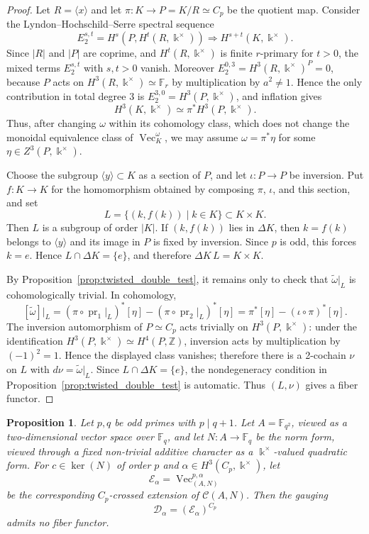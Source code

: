 \documentclass[12pt]{amsart}
\theoremstyle{plain}
\newtheorem{proposition}[theorem]{Proposition}
\theoremstyle{definition} %
\theoremstyle{remark} %
\newcommand{\ku}{{\Bbbk}} %
\DeclareMathOperator{\VecCat}{Vec}
\newcommand{\Vect}[1]{\VecCat_{#1}}
\newcommand{\cC}{\mathcal{C}}
\newcommand{\cD}{\mathcal{D}}
\newcommand{\cE}{\mathcal{E}}
\newcommand{\pr}{\operatorname{pr}}
\begin{document}
\begin{proof}
Let $R=\langle x\rangle$ and let $\pi:K\to P=K/R\simeq C_p$ be the quotient map. Consider the Lyndon--Hochschild--Serre spectral sequence
\[
E_2^{s,t}=H^s(P,H^t(R,\ku^\times))\Rightarrow H^{s+t}(K,\ku^\times).
\]
Since $|R|$ and $|P|$ are coprime, and $H^t(R,\ku^\times)$ is finite $r$-primary for $t>0$, the mixed terms $E_2^{s,t}$ with $s,t>0$ vanish. Moreover $E_2^{0,3}=H^3(R,\ku^\times)^P=0$, because $P$ acts on $H^3(R,\ku^\times)\simeq\mathbb{F}_r$ by multiplication by $a^2\ne1$. Hence the only contribution in total degree $3$ is $E_2^{3,0}=H^3(P,\ku^\times)$, and inflation gives
\[
H^3(K,\ku^\times)\simeq \pi^*H^3(P,\ku^\times).
\]
Thus, after changing $\omega$ within its cohomology class, which does not change the monoidal equivalence class of $\Vect{K}^{\omega}$, we may assume $\omega=\pi^*\eta$ for some $\eta\in Z^3(P,\ku^\times)$.

Choose the subgroup $\langle y\rangle\subset K$ as a section of $P$, and let $\iota:P\to P$ be inversion. Put $f:K\to K$ for the homomorphism obtained by composing $\pi$, $\iota$, and this section, and set
\[
L=\{(k,f(k))\mid k\in K\}\subset K\times K.
\]
Then $L$ is a subgroup of order $|K|$. If $(k,f(k))$ lies in $\Delta K$, then $k=f(k)$ belongs to $\langle y\rangle$ and its image in $P$ is fixed by inversion. Since $p$ is odd, this forces $k=e$. Hence $L\cap \Delta K=\{e\}$, and therefore $\Delta K\,L=K\times K$.

By Proposition~\ref{prop:twisted_double_test}, it remains only to check that $\widetilde{\omega}|_L$ is cohomologically trivial. In cohomology,
\[
[\widetilde{\omega}]|_L
=(\pi\circ \pr_1|_L)^*[\eta]
-(\pi\circ \pr_2|_L)^*[\eta]
=\pi^*[\eta]-(\iota\circ\pi)^*[\eta].
\]
The inversion automorphism of $P\simeq C_p$ acts trivially on $H^3(P,\ku^\times)$: under the identification
$H^3(P,\ku^\times)\simeq H^4(P,\mathbb{Z})$, inversion acts by multiplication by $(-1)^2=1$. Hence the displayed class vanishes; therefore there is a 2-cochain $\nu$ on $L$ with $d\nu=\widetilde{\omega}|_L$. Since $L\cap\Delta K=\{e\}$, the nondegeneracy condition in Proposition~\ref{prop:twisted_double_test} is automatic. Thus $(L,\nu)$ gives a fiber functor.
\end{proof}

\begin{proposition}\label{prop:elliptic_prime_cyclic_no_fiber}
Let $p,q$ be odd primes with $p\mid q+1$. Let $A=\mathbb{F}_{q^2}$, viewed as a two-dimensional vector space over $\mathbb{F}_q$, and let $N:A\to\mathbb{F}_q$ be the norm form, viewed through a fixed non-trivial additive character as a $\ku^\times$-valued quadratic form. For $c\in\ker(N)$ of order $p$ and $\alpha\in H^3(C_p,\ku^\times)$, let
\[
\cE_\alpha=\VecCat_{(A,N)}^{p,\alpha}
\]
be the corresponding $C_p$-crossed extension of $\cC(A,N)$. Then the gauging
\[
\cD_\alpha=(\cE_\alpha)^{C_p}
\]
admits no fiber functor.
\end{proposition}
\end{document}
